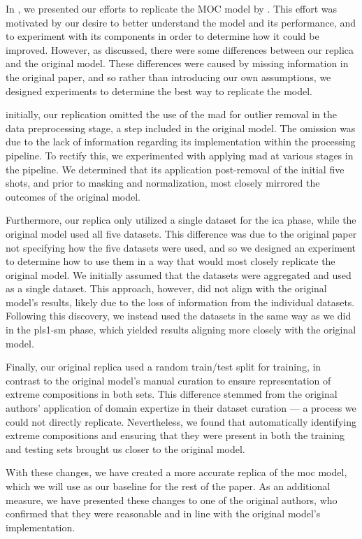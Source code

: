 In \citet{p9_paper}, we presented our efforts to replicate the MOC model by \citet{cleggRecalibrationMarsScience2017}.
This effort was motivated by our desire to better understand the model and its performance, and to experiment with its components in order to determine how it could be improved.
However, as discussed, there were some differences between our replica and the original model.
These differences were caused by missing information in the original paper, and so rather than introducing our own assumptions, we designed experiments to determine the best way to replicate the model.

initially, our replication omitted the use of the \gls{mad} for outlier removal in the data preprocessing stage, a step included in the original model.
The omission was due to the lack of information regarding its implementation within the processing pipeline.
To rectify this, we experimented with applying \gls{mad} at various stages in the pipeline.
We determined that its application post-removal of the initial five shots, and prior to masking and normalization, most closely mirrored the outcomes of the original model.

Furthermore, our replica only utilized a single dataset for the \gls{ica} phase, while the original model used all five datasets.
This difference was due to the original paper not specifying how the five datasets were used, and so we designed an experiment to determine how to use them in a way that would most closely replicate the original model.
We initially assumed that the datasets were aggregated and used as a single dataset.
This approach, however, did not align with the original model's results, likely due to the loss of information from the individual datasets.
Following this discovery, we instead used the datasets in the same way as we did in the \gls{pls1-sm} phase, which yielded results aligning more closely with the original model.

Finally, our original replica used a random train/test split for training, in contrast to the original model's manual curation to ensure representation of extreme compositions in both sets.
This difference stemmed from the original authors' application of domain expertize in their dataset curation --- a process we could not directly replicate.
Nevertheless, we found that automatically identifying extreme compositions and ensuring that they were present in both the training and testing sets brought us closer to the original model.

With these changes, we have created a more accurate replica of the \gls{moc} model, which we will use as our baseline for the rest of the paper.
As an additional measure, we have presented these changes to one of the original authors, who confirmed that they were reasonable and in line with the original model's implementation.

